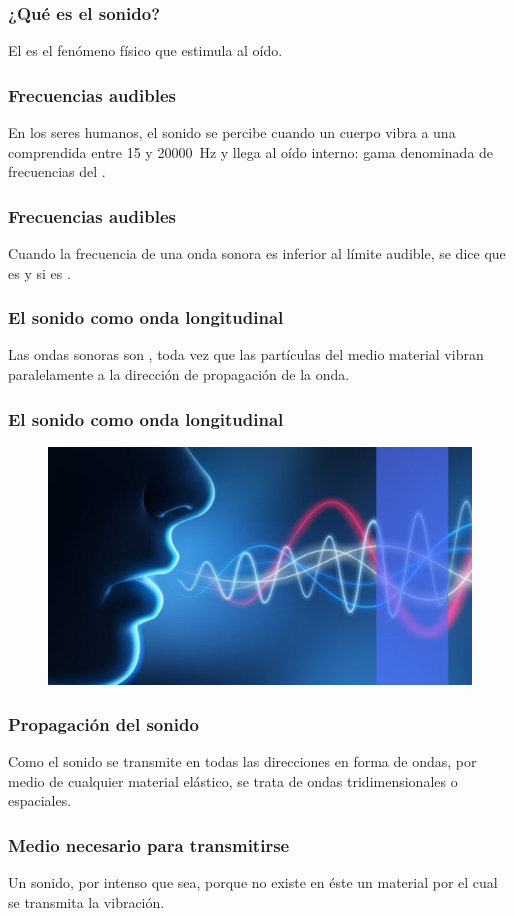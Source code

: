 \documentclass[14pt]{beamer}
\begin{document}
\begin{frame}
\frametitle{¿Qué es el sonido?}
El  es el fenómeno físico que estimula al oído.
\end{frame}
\begin{frame}
\frametitle{Frecuencias audibles}    
En los seres humanos, el sonido se percibe cuando un cuerpo vibra a una  comprendida entre 15 y \SI{20000}{\hertz} y llega al oído interno: \pause gama denominada de frecuencias del .
\end{frame}
\begin{frame}
\frametitle{Frecuencias audibles}    
Cuando la frecuencia de una onda sonora es inferior al límite audible, \pause se dice que es  \pause y si es .
\end{frame}
\begin{frame}
\frametitle{El sonido como onda longitudinal}
Las ondas sonoras son , toda vez que las partículas del medio material vibran paralelamente a la dirección de propagación de la onda.
\end{frame}
\begin{frame}
\frametitle{El sonido como onda longitudinal}
\begin{figure}
    \centering
    \includegraphics[scale=0.6]{Imagenes/Sonido_01.jpg}
\end{figure}
\end{frame}
\begin{frame}
\frametitle{Propagación del sonido}
Como el sonido se transmite en todas las direcciones en forma de ondas, por medio de cualquier material elástico, se trata de ondas tridimensionales o espaciales.
\end{frame}
\begin{frame}
\frametitle{Medio necesario para transmitirse}
Un sonido, por intenso que sea,  porque no existe en éste un material por el cual se transmita la vibración.
\end{frame}
\end{document}
